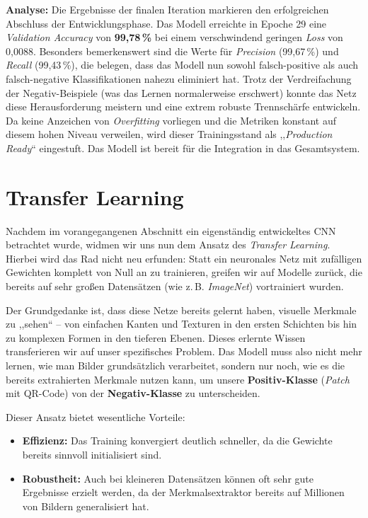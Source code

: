 \documentclass[
    a4paper,        %
    11pt,           %
    ngerman,        %
    parskip=half,   %
    listof=totoc,   %
    bibliography=totoc %
]{scrartcl}
\let\oldsection\section
\renewcommand\section{\clearpage\oldsection}
\begin{document}
\textbf{Analyse:}
Die Ergebnisse der finalen Iteration markieren den erfolgreichen Abschluss der Entwicklungsphase.
Das Modell erreichte in Epoche 29 eine \textit{Validation Accuracy} von \textbf{99,78\,\%} bei einem verschwindend geringen \textit{Loss} von 0,0088. Besonders bemerkenswert sind die Werte für \textit{Precision} (99,67\,\%) und \textit{Recall} (99,43\,\%), die belegen, dass das Modell nun sowohl falsch-positive als auch falsch-negative Klassifikationen nahezu eliminiert hat.
Trotz der Verdreifachung der Negativ-Beispiele (was das Lernen normalerweise erschwert) konnte das Netz diese Herausforderung meistern und eine extrem robuste Trennschärfe entwickeln. Da keine Anzeichen von \textit{Overfitting} vorliegen und die Metriken konstant auf diesem hohen Niveau verweilen, wird dieser Trainingsstand als ,,\textit{Production Ready}`` eingestuft. Das Modell ist bereit für die Integration in das Gesamtsystem.

\section{Transfer Learning}

Nachdem im vorangegangenen Abschnitt ein eigenständig entwickeltes CNN betrachtet wurde, widmen wir uns nun dem Ansatz des \textit{Transfer Learning}. Hierbei wird das Rad nicht neu erfunden: Statt ein neuronales Netz mit zufälligen Gewichten komplett von Null an zu trainieren, greifen wir auf Modelle zurück, die bereits auf sehr großen Datensätzen (wie z.\,B. \textit{ImageNet}) vortrainiert wurden.

Der Grundgedanke ist, dass diese Netze bereits gelernt haben, visuelle Merkmale zu ,,sehen`` – von einfachen Kanten und Texturen in den ersten Schichten bis hin zu komplexen Formen in den tieferen Ebenen. Dieses erlernte Wissen transferieren wir auf unser spezifisches Problem. Das Modell muss also nicht mehr lernen, wie man Bilder grundsätzlich verarbeitet, sondern nur noch, wie es die bereits extrahierten Merkmale nutzen kann, um unsere \textbf{Positiv-Klasse} (\textit{Patch} mit QR-Code) von der \textbf{Negativ-Klasse} zu unterscheiden.

Dieser Ansatz bietet wesentliche Vorteile:
\begin{itemize}
    \item \textbf{Effizienz:} Das Training konvergiert deutlich schneller, da die Gewichte bereits sinnvoll initialisiert sind.
    \item \textbf{Robustheit:} Auch bei kleineren Datensätzen können oft sehr gute Ergebnisse erzielt werden, da der Merkmalsextraktor bereits auf Millionen von Bildern generalisiert hat.
\end{itemize}
\end{document}
